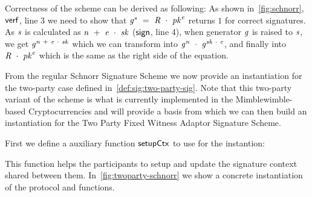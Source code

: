 Correctness of the scheme can be derived as following:
As shown in~\cref{fig:schnorr}, $\mathsf{verf}$, line 3 we need to show that $\mathit{g}^{\mathit{s}} ~=~ \mathit{R} ~\cdot~ \mathit{pk}^{\mathit{e}}$ returns $1$ for correct signatures.
As $\mathit{s}$ is calculated as $\mathit{n} ~+~ \mathit{e} ~\cdot~ \mathit{sk}$ ($\mathsf{sign}$, line 4), when generator $\mathit{g}$ is raised to $\mathit{s}$, we get $\mathit{g}^{\mathit{n} ~+~ \mathit{e} ~\cdot~ \mathit{sk}}$ which we can transform into $\mathit{g}^{\mathit{n}} ~\cdot~ \mathit{g}^{\mathit{sk} ~\cdot~ \mathit{e}}$, and finally into $\mathit{R} ~\cdot~ \mathit{pk}^{\mathit{e}}$ which is the same as the right side of the equation.

From the regular Schnorr Signature Scheme we now provide an instantiation for the two-party case defined in~\cref{def:sig:two-party-sig}.
Note that this two-party variant of the scheme is what is currently implemented in the Mimblewimble-based Cryptocurrencies and will provide a basis from which we can then build an instantiation for the Two Party Fixed Witness Adaptor Signature Scheme.

First we define a auxiliary function $\mathsf{setupCtx}$ to use for the instantion:

\begin{center}
    \fbox{
    \begin{varwidth}{\textwidth}
        \procedure[linenumbering]{$\procSetupCtx{\varSigContext}{\varPubKeyAlice}{\varRandAlice}$} {
        \opAccess{\varSigContext}{\varPubKey} \opAssign \opAccess{\varSigContext}{\varPubKey} \opAddPoint \varPubKeyAlice \\
        \opAccess{\varSigContext}{\varRand} \opAssign \opAccess{\varSigContext}{\varRand} \opAddPoint \varRandAlice \\
        \pcreturn \varSigContext
        } \\
    \end{varwidth}
    }
\end{center}

This function helps the participants to setup and update the signature context shared between them.
In~\cref{fig:twoparty-schnorr} we show a concrete instantiation of the protocol and functions.

